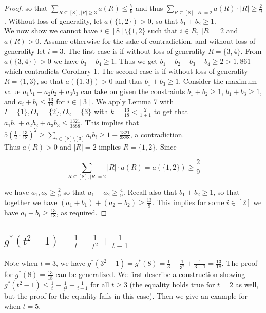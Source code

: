 \documentclass{article}
\begin{document}
\begin{proof}
\noindent
so that $\sum_{R \subseteq [8], |R| \geq 3} a(R) \leq \frac{7}{9}$ and thus $\sum_{R \subseteq [8], |R| = 2} a(R) \cdot|R| \geq \frac{2}{9}$. Without loss of generality, let $a(\{1,2\}) > 0$, so that $b_1 + b_2 \geq 1$. \\

We now show we cannot have $i \in [8] \setminus \{1,2\}$ such that $i \in R, \ |R| = 2$ and $a(R) > 0$. Assume otherwise for the sake of contradiction, and without loss of generality let $i = 3$. The first case is if without loss of generality $R = \{3,4\}$. From $a(\{3,4\}) > 0$ we have $b_3 + b_4 \geq 1$. Thus we get $b_1 + b_2 + b_3 + b_4 \geq 2 > 1,861$ which contradicts Corollary 1. The second case is if without loss of generality $R = \{1,3\}$, so that $a(\{1,3\}) > 0$ and thus $b_1 + b_3 \geq 1$. Consider the maximum value $a_1b_1 + a_2b_2 + a_3b_3$ can take on given the constraints $b_1 + b_2 \geq 1$, $b_1 + b_3 \geq 1$, and $a_i+b_i \leq \frac{13}{18}$ for $i \in [3]$. We apply Lemma 7 with $I = \{1\}, O_1 = \{2\}, O_2 = \{3\}$ with $k = \frac{13}{18} < \frac{2}{1+1}$ to get that $a_1b_1 + a_2b_2 + a_3b_3 \leq \frac{1321}{3888}$. This implies that $5 (\frac{1}{2} \cdot \frac{13}{18})^2 \geq \sum_{i \in [8] \setminus [3]} a_ib_i \geq 1 - \frac{1321}{3888}$, a contradiction. \\

Thus $a(R) > 0$ and $|R| = 2$ implies $R = \{1,2\}$. Since 

$$\sum_{R \subseteq [8], |R| = 2} |R| \cdot a(R) = a(\{1,2\}) \geq \frac{2}{9}$$

\noindent
we have $a_1, a_2 \geq \frac{2}{9}$ so that $a_1 + a_2 \geq \frac{4}{9}$. Recall also that $b_1 + b_2 \geq 1$, so that together we have $(a_1+b_1) + (a_2+b_2) \geq \frac{13}{9}$. This implies for some $i \in [2]$ we have $a_i+b_i \geq \frac{13}{18}$, as required. 
\end{proof}

\begin{center}
\section{$g^*(t^2-1) = \frac{1}{t}-\frac{1}{t^2}+\frac{1}{t-1}$}
\end{center}

Note when $t = 3$, we have $g^*(3^2-1) = g^*(8) = \frac{1}{3} - \frac{1}{3^2} + \frac{1}{3-1} = \frac{13}{18}$. The proof for $g^*(8) = \frac{13}{18}$ can be generalized. We first describe a construction showing $g^*(t^2-1) \leq \frac{1}{t}-\frac{1}{t^2}+\frac{1}{t-1}$ for all $t \geq 3$ (the equality holds true for $t = 2$ as well, but the proof for the equality fails in this case). Then we give an example for when $t = 5$. \\
\end{document}
